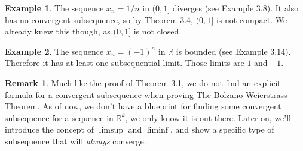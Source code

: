 \documentclass{article}
\newcommand{\R}{\mathbb{R}}
\theoremstyle{definition}
\newtheorem{example}{Example}[section]
\newtheorem{remark}{Remark}[section]
\begin{document}
	\begin{example}
		The sequence $ x_n=1/n $ in $(0,1] $ diverges (see Example 3.8). It also has no convergent subsequence, so by Theorem 3.4, $ (0,1] $ is not compact. We already knew this though, as $ (0,1] $ is not closed.
	\end{example}
	\begin{example}
		The sequence $ x_n=(-1)^n $ in $ \R $ is bounded (see Example 3.14). Therefore it has at least one subsequential limit. Those limits are $ 1 $ and $ -1 $.  
	\end{example}
	\begin{remark}
		Much like the proof of Theorem 3.1, we do not find an explicit formula for a convergent subsequence when proving The Bolzano-Weierstrass Theorem. As of now, we don't have a blueprint for finding some convergent subsequence for a sequence in $ \R^k $, we only know it is out there. Later on, we'll introduce the concept of $ \limsup $ and $ \liminf $, and show a specific type of subsequence that will \textit{always} converge. 
	\end{remark}
\end{document}
